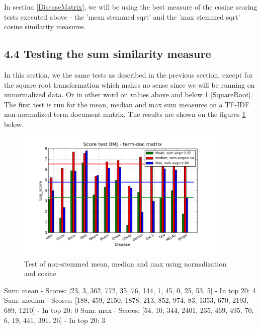 In section \ref{DiseaseMatrix}, we will be using the best measure of the cosine scoring tests executed above - the 'mean stemmed sqrt' and the 'max stemmed sqrt' cosine similarity measures. 

\subsection{4.4 Testing the sum similarity measure\label{TestingSumSimilarity}}

In this section, we the same tests as described in the previous section, except for the square root transformation which makes no sense since we will be running on unnormalized data. Or in other word on values above and below 1 \ref{SquareRoot}. The first test is run for the mean, median and max sum measures on a TF-IDF non-normalized term document matrix. The results are shown on the figures \ref{termDoc_bmj_hist_3000_sum_mea_med_max} below.

\begin{figure}[h!]
        \begin{center}
          \includegraphics[width=0.9\textwidth]{barcharts/termDoc_bmj_hist_3000_sum_mea_med_max.png}
        \end{center}
        \caption{Test of non-stemmed mean, median and max using normalization and cosine}
        \label{termDoc_bmj_hist_3000_sum_mea_med_max}
\end{figure}

Sum: mean - Scores: [23, 3, 362, 772, 35, 76, 144, 1, 45, 0, 25, 53, 5] - In top 20: 4
Sum: median - Scores: [188, 459, 2150, 1878, 213, 852, 974, 83, 1353, 670, 2193, 689, 1210] - In top 20: 0
Sum: max - Scores: [54, 10, 344, 2401, 235, 469, 495, 70, 6, 19, 441, 391, 26] - In top 20: 3

